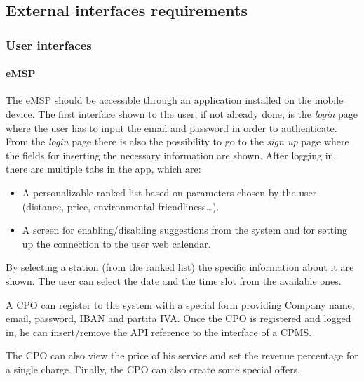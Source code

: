 \subsection{External interfaces requirements}

\subsubsection{User interfaces}
\paragraph{\ac{eMSP}}
The \ac{eMSP} should be accessible through an application installed on the mobile device.
The first interface shown to the user, if not already done, is the \textit{login} page where the user has to input the email and password in order to authenticate.
From the \textit{login} page there is also the possibility to go to the \textit{sign up} page where the fields for inserting the necessary information are shown.
After logging in, there are multiple tabs in the app, which are:
\begin{itemize}
    \item A personalizable ranked list based on parameters chosen by the user (distance, price, environmental friendliness\ldots).
    \item A screen for enabling/disabling suggestions from the system and for setting up the connection to the user web calendar.
\end{itemize}
By selecting a station (from the ranked list) the specific information about it are shown. The user can select the date and the time slot from the available ones.

A \ac{CPO} can register to the system with a special form providing Company name, email, password, \ac{IBAN} and \gls{partita IVA}. Once the \ac{CPO} is registered and logged in, he can insert/remove the \ac{API} reference to the interface of a \ac{CPMS}.

The \ac{CPO} can also view the price of his service and set the revenue percentage for a single charge. Finally, the \ac{CPO} can also create some special offers.

